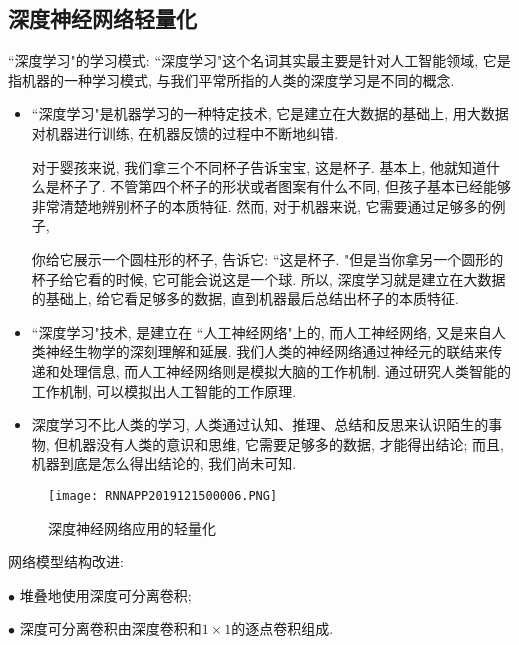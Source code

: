 \subsection{深度神经网络轻量化}
 ``深度学习"的学习模式:  ``深度学习"这个名词其实最主要是针对人工智能领域, 它是指机器的一种学习模式, 与我们平常所指的人类的深度学习是不同的概念.
\begin{itemize}
    \item  ``深度学习"是机器学习的一种特定技术, 它是建立在大数据的基础上, 用大数据对机器进行训练, 在机器反馈的过程中不断地纠错.
    \begin{example}
    对于婴孩来说, 我们拿三个不同杯子告诉宝宝, 这是杯子.
    基本上, 他就知道什么是杯子了. 不管第四个杯子的形状或者图案有什么不同, 但孩子基本已经能够非常清楚地辨别杯子的本质特征.
    然而, 对于机器来说, 它需要通过足够多的例子,
    \end{example}
    \begin{example}
    你给它展示一个圆柱形的杯子, 告诉它:  ``这是杯子. "但是当你拿另一个圆形的杯子给它看的时候, 它可能会说这是一个球.
    所以, 深度学习就是建立在大数据的基础上, 给它看足够多的数据, 直到机器最后总结出杯子的本质特征.
    \end{example}
    \item  ``深度学习"技术, 是建立在 ``人工神经网络"上的, 而人工神经网络, 又是来自人类神经生物学的深刻理解和延展.
    我们人类的神经网络通过神经元的联结来传递和处理信息, 而人工神经网络则是模拟大脑的工作机制.
    通过研究人类智能的工作机制, 可以模拟出人工智能的工作原理.

    \item 深度学习不比人类的学习, 人类通过认知、推理、总结和反思来认识陌生的事物, 但机器没有人类的意识和思维, 它需要足够多的数据, 才能得出结论; 而且, 机器到底是怎么得出结论的, 我们尚未可知.
\end{itemize}
\begin{figure}[H]
\centering
\texttt{[image: RNNAPP2019121500006.PNG]}
\caption{深度神经网络应用的轻量化}
\label{RNNAPP2019121500006}\vspace{-0.4cm}
\end{figure}

网络模型结构改进:

\begin{tcolorbox}[title=MobileNet]
$\bullet$ 堆叠地使用深度可分离卷积;

$\bullet$ 深度可分离卷积由深度卷积和$1\times 1$的逐点卷积组成.
\end{tcolorbox}

